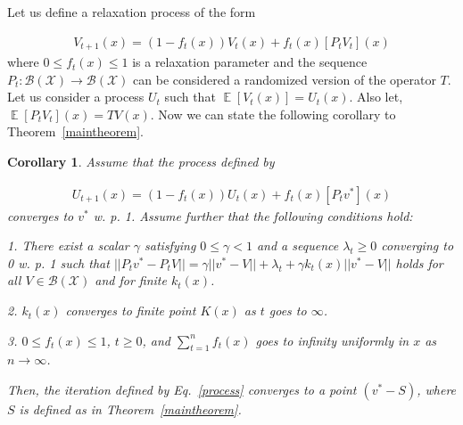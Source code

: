\documentclass[jair, twoside,11pt,theapa]{article}
\DeclareMathOperator{\E}{\mathbb{E}}
\newtheorem{corr}{Corollary}
\begin{document}



Let us define a relaxation process of the form 

\begin{equation}\label{process}
    \begin{array}{l}
         V_{t+1}(x) = (1 - f_t(x))V_t(x) + f_t(x) [P_t V_t](x)
    \end{array}
\end{equation}
where $0 \leq f_t(x) \leq 1$ is a relaxation parameter and the sequence $P_t: \mathcal{B}(\mathscr{X}) \xrightarrow{} \mathcal{B}(\mathscr{X})$ can be considered a randomized version of the operator $T$.  Let us consider a process $U_t$ such that $\E[V_t(x)] = U_t(x)$.  Also let, $\E[P_t V_t](x) = T V(x)$.
Now we can state the following corollary to Theorem~\ref{maintheorem}.

\begin{corr}\label{corr:conditionalCorollary}
Assume that the process defined by 

\begin{equation}\label{process2}
    \begin{array}{l}
         U_{t+1}(x) = (1 - f_t(x))U_t(x) + f_t(x) [P_t v^*](x)
    \end{array}
\end{equation}
converges to $v^*$ w. p. 1. Assume further that the following conditions hold: 

1. There exist a scalar $\gamma$ satisfying $0\leq \gamma<1$ and a sequence $\lambda_t \geq 0$ converging to 0 w. p. 1 such that $|| P_t v^* - P_t V||  = \gamma ||v^* - V|| + \lambda_t  + \gamma k_t (x) ||v^* - V||$ holds for all $V \in \mathcal{B}(\mathscr{X})$ and for finite $k_t(x)$.

2. $k_t(x)$ converges to finite point $K(x)$ as $t$ goes to $\infty$. 

3. $0 \leq f_t(x) \leq 1$, $t \geq 0$, and $\sum_{t=1}^{n} f_t(x)$ goes to infinity uniformly in $x$ as $n \xrightarrow{} \infty$. 

\noindent Then, the iteration defined by Eq.~\ref{process} converges to a point $(v^* - S)$, where $S$ is defined as in Theorem~\ref{maintheorem}. 
\end{corr}
\end{document}
